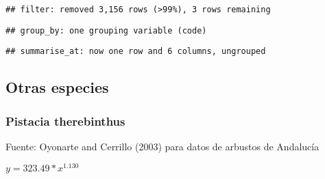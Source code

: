\documentclass[]{article}
\newenvironment{Shaded}{\begin{snugshade}}{\end{snugshade}}
\newcommand{\KeywordTok}[1]{\textcolor[rgb]{0.13,0.29,0.53}{\textbf{#1}}}
\newcommand{\NormalTok}[1]{#1}
\newcommand{\OperatorTok}[1]{\textcolor[rgb]{0.81,0.36,0.00}{\textbf{#1}}}
\newcommand{\StringTok}[1]{\textcolor[rgb]{0.31,0.60,0.02}{#1}}
\begin{document}
\begin{Shaded}
\end{Shaded}

\begin{verbatim}
## filter: removed 3,156 rows (>99%), 3 rows remaining
\end{verbatim}

\begin{Shaded}
\end{Shaded}

\begin{verbatim}
## group_by: one grouping variable (code)
\end{verbatim}

\begin{verbatim}
## summarise_at: now one row and 6 columns, ungrouped
\end{verbatim}

\hypertarget{otras-especies}{%
\subsection{Otras especies}\label{otras-especies}}

\hypertarget{pistacia-therebinthus}{%
\subsubsection{Pistacia therebinthus}\label{pistacia-therebinthus}}

Fuente: Oyonarte and Cerrillo (2003) para datos de arbustos de Andalucía

\(y = 323.49 * x^{1.130}\)
\end{document}
